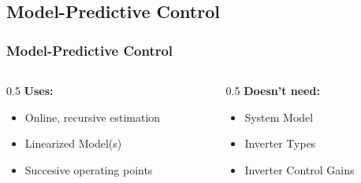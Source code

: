 \documentclass[
    aspectratio=169,
    \ifdefined\HANDOUT
    handout
    \else
    \fi
]{beamer}
\begin{document}
\subsection*{Model-Predictive Control}
\begin{frame}
    \frametitle{Model-Predictive Control}
    \begin{columns}
        \begin{column}[T]{0.5\textwidth}
            \textbf{Uses:}
            \begin{itemize}
                \item Online, recursive estimation
                \item Linearized Model(s)
                \item Succesive operating points
            \end{itemize}
        \end{column}
        \begin{column}[T]{0.5\textwidth}
            \textbf{Doesn't need:}
            \begin{itemize}
                \item System Model
                \item Inverter Types
                \item Inverter Control Gains
            \end{itemize}
        \end{column}
    \end{columns}
\end{frame}
\end{document}
